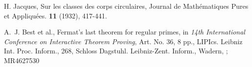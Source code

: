 \documentclass{article}
\begin{document}
\begin{thebibliography}{99}
H. Jacques, Sur les classes des corps circulaires, Journal de Mathématiques Pures et Appliquées. \textbf{11} (1932), 417-441.

A.~J. Best et al., Fermat's last theorem for regular primes, in {\it 14th International Conference on Interactive Theorem Proving}, Art. No. 36, 8 pp., LIPIcs. Leibniz Int. Proc. Inform., 268, Schloss Dagstuhl. Leibniz-Zent. Inform., Wadern, ; MR4627530




\end{thebibliography}
\end{document}
